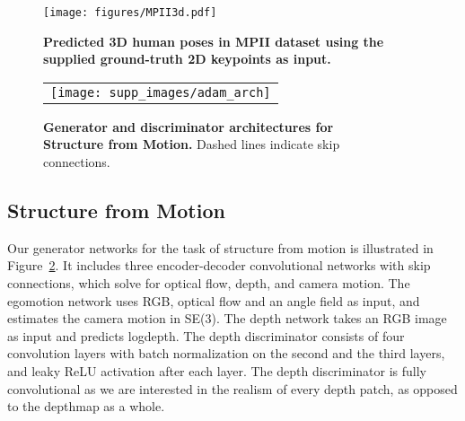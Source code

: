 \documentclass[10pt,twocolumn,letterpaper]{article}
\begin{document}
\begin{figure}[t]
    \centering
    \texttt{[image: figures/MPII3d.pdf]}
     \centering
    \caption{\textbf{Predicted 3D human poses in MPII dataset using the supplied ground-truth 2D keypoints as input.} }
    \label{fig:mpii}
\end{figure}


\begin{figure}[t]
    \begin{tabular}{l}
    \texttt{[image: supp\_images/adam\_arch]} \\
    \end{tabular}
\centering
    \label{fig:architectures2}
    \caption{\textbf{Generator and discriminator architectures for  \\Structure from Motion.} Dashed lines indicate skip  \\connections. \\}
\end{figure}



\subsection{Structure from Motion}
Our generator networks for the task of structure from motion is illustrated in Figure~\ref{fig:architectures2}. It includes three encoder-decoder convolutional networks with skip connections, which solve for optical flow, depth, and camera motion. The egomotion network uses RGB, optical flow and an angle field as input, and estimates the camera motion in SE(3). %
The depth network takes an RGB image as input and predicts logdepth. 
The depth discriminator consists of four convolution layers with batch normalization on the second and the third layers, and leaky ReLU activation after each layer. The depth  discriminator is fully convolutional as we are interested in the realism of every depth patch, as opposed to the depthmap as a whole. 
\end{document}
